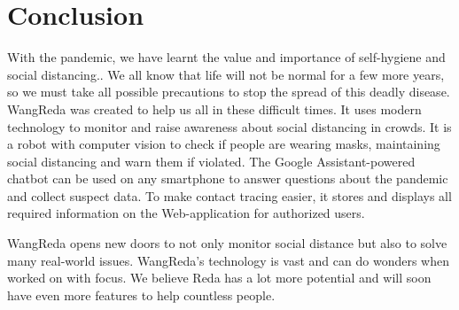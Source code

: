 \documentclass[AMA,STIX1COL]{WileyNJD-v2}
\begin{document}
\section {Conclusion}

With the pandemic, we have learnt the value and importance of self-hygiene and social distancing.. We all know that life will not be normal for a few more years, so we must take all possible precautions to stop the spread of this deadly disease. WangReda was created to help us all in these difficult times. It uses modern technology to monitor and raise awareness about social distancing in crowds. It is a robot with computer vision to check if people are wearing masks, maintaining social distancing and warn them if violated. The Google Assistant-powered chatbot can be used on any smartphone to answer questions about the pandemic and collect suspect data. To make contact tracing easier, it stores and displays all required information on the Web-application for authorized users.

WangReda opens new doors to not only monitor social distance but also to solve many real-world issues. WangReda's technology is vast and can do wonders when worked on with focus. We believe Reda has a lot more potential and will soon have even more features to help countless people.


\end{document}
